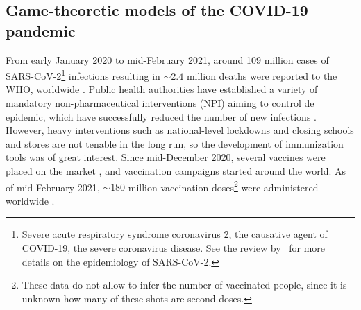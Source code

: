 \subsection{Game-theoretic models of the COVID-19 pandemic}

\noindent From early January 2020 to mid-February 2021, around 109 million cases of SARS-CoV-2\footnote{Severe acute respiratory syndrome coronavirus 2, the causative agent of COVID-19, the severe coronavirus disease. See the review by~\cite{Salzberger2020} for more details on the epidemiology of SARS-CoV-2.} infections resulting in $\sim2.4$ million deaths were reported to the WHO, worldwide \cite[]{WHO_CovidDashboard}. Public health authorities have established a variety of mandatory non-pharmaceutical interventions (NPI) aiming to control de epidemic, %
which have successfully reduced the number of new infections \cite[]{Bo2021}. However, heavy interventions such as national-level lockdowns and closing schools and stores are not tenable in the long run, so the development of immunization tools was of great interest. Since mid-December 2020, several vaccines %
were placed on the market \cite[]{WHO_CovidVaccines}, and vaccination campaigns started around the world. As of mid-February 2021, $\sim180$ million vaccination doses\footnote{These data do not allow to infer the number of vaccinated people, since it is unknown how many of these shots are second doses.} were administered worldwide \cite[]{OWID_CovidVaccination}. %

